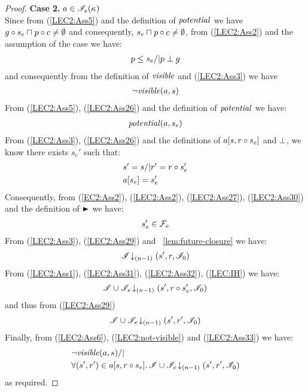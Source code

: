 \begin{lemma}
\begin{proof}
\noindent\textbf{Case 2. } $a \in \mathscr{I}_e(\kappa_{})$\\
Since from (\ref{LEC2:Ass5}) and the definition of $\mathit{potential}$ we have $g \circ s_e \sqcap_{} p \circ c \not= \emptyset$ and consequently, $s_e \sqcap_{} p \circ c \not= \emptyset$, from (\ref{LEC2:Ass2}) and the assumption of the case we have:
%
\begin{align}
	p \leq s_e /| p \mathrel{\bot} g \label{LEC2:Ass26}
\end{align}
% 
and consequently from the definition of $\mathit{visible}$ and (\ref{LEC2:Ass3}) we have
%
\begin{align}
	\neg\mathit{visible}(a, s)
	\label{LEC2:not-visible}
\end{align}
%
From (\ref{LEC2:Ass5}), (\ref{LEC2:Ass26}) and the definition of $\mathit{potential}$ we have:
%
\begin{align}
	\mathit{potential}(a, s_e) \label{LEC2:Ass27}
\end{align}
%
From (\ref{LEC2:Ass3}), (\ref{LEC2:Ass26}) and the definitions of $a[s, r \circ s_e]$ and $\mathrel{\bot}$, we know there exists $s_e'$ such that: 
%
\begin{align}
	& s' = s /| r' = r \circ s_e' \label{LEC2:Ass29}\\
	& a[s_e] = s_e'  \label{LEC2:Ass30}
\end{align}
%
Consequently, from (\ref{EC2:Ass2}), (\ref{LEC2:Ass2}), (\ref{LEC2:Ass27}), (\ref{LEC2:Ass30}) and the definition of $\strictfences$ we have:
%
\begin{align}
	s_e' \in \mathcal{F}_{e}  \label{LEC2:Ass31}
\end{align}
%
From (\ref{LEC2:Ass3}), (\ref{LEC2:Ass29}) and \lem~\ref{lem:future-closure} we have:
%
\begin{align}
	\mathscr{I} \!\downarrow_{(n-1)} \left(s', r, \mathscr{I}_0\right)  \label{LEC2:Ass32}
\end{align}
%
From (\ref{LEC2:Ass1}), (\ref{LEC2:Ass31}), (\ref{LEC2:Ass32}), (\ref{LEC:IH}) we have:
%
\begin{align*}
	\mathscr{I} \cup \mathscr{I}_{e} \!\downarrow_{(n-1)} \left(s', r \circ s_e', \mathscr{I}_0\right)
\end{align*}
%
and thus from (\ref{LEC2:Ass29}) 
%
\begin{align}
	\mathscr{I} \cup \mathscr{I}_{e} \!\downarrow_{(n-1)} \left(s', r', \mathscr{I}_0\right)
	\label{LEC2:Ass33}
\end{align}
%
Finally, from (\ref{LEC2:Ass6}), (\ref{LEC2:not-visible}) and (\ref{LEC2:Ass33}) we have:
%
\begin{align*}
	&\neg\mathit{visible}(a, s) /|\\
	& \forall (s', r') \in a[s, r \circ s_e].\, \mathscr{I} \cup \mathscr{I}_{e} \!\downarrow_{(n-1)} \left(s', r', \mathscr{I}_0\right)
\end{align*}
%
as required.

\end{proof}
\end{lemma}
